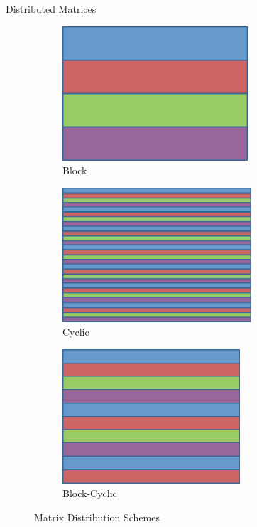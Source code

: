 \begin{frame}
\begin{block}{Distributed Matrices}
\begin{figure}[ht]
        \centering
        \begin{subfigure}[b]{0.3\textwidth}
                \centering
                
\includegraphics[height=5cm,width=\textwidth]{pics/dmat_block}
                \caption{Block}
        \end{subfigure}
        \hspace{.1cm}
        \begin{subfigure}[b]{0.3\textwidth}
                \centering
                
\includegraphics[height=5cm,width=\textwidth]{pics/dmat_cyclic}
                \caption{Cyclic}
        \end{subfigure}
        \hspace{.01cm}
        \begin{subfigure}[b]{0.3\textwidth}
                \centering
                
\includegraphics[height=5cm,width=\textwidth]{pics/dmat_blockcyclic}
                \caption{Block-Cyclic}
        \end{subfigure}
        \caption{Matrix Distribution Schemes}\label{fig:dmat1d}
\end{figure}
\end{block}
\end{frame}



